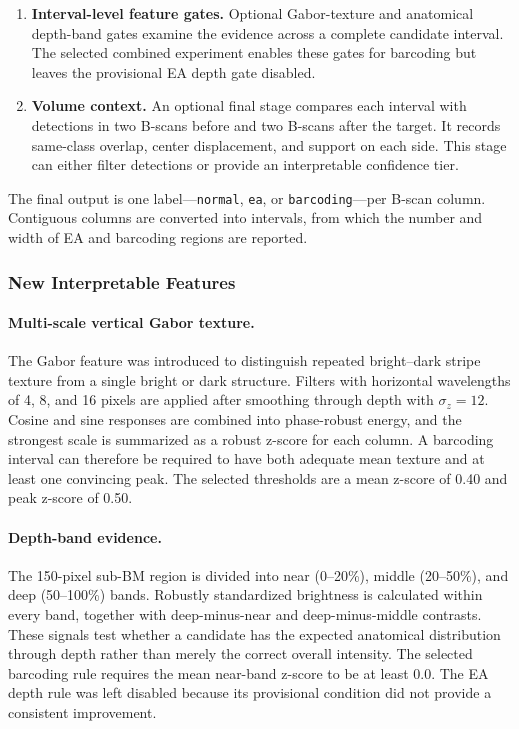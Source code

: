 \documentclass[11pt]{article}
\begin{document}
\begin{enumerate}
    \item \textbf{Interval-level feature gates.}  Optional Gabor-texture and
    anatomical depth-band gates examine the evidence across a complete
    candidate interval.  The selected combined experiment enables these gates
    for barcoding but leaves the provisional EA depth gate disabled.

    \item \textbf{Volume context.}  An optional final stage compares each
    interval with detections in two B-scans before and two B-scans after the
    target.  It records same-class overlap, center displacement, and support on
    each side.  This stage can either filter detections or provide an
    interpretable confidence tier.
\end{enumerate}

The final output is one label---\texttt{normal}, \texttt{ea}, or
\texttt{barcoding}---per B-scan column.  Contiguous columns are converted into
intervals, from which the number and width of EA and barcoding regions are
reported.

\subsubsection{New Interpretable Features}

\paragraph{Multi-scale vertical Gabor texture.}
The Gabor feature was introduced to distinguish repeated bright--dark stripe
texture from a single bright or dark structure.  Filters with horizontal
wavelengths of 4, 8, and 16 pixels are applied after smoothing through depth
with $\sigma_z=12$.  Cosine and sine responses are combined into phase-robust
energy, and the strongest scale is summarized as a robust z-score for each
column.  A barcoding interval can therefore be required to have both adequate
mean texture and at least one convincing peak.  The selected thresholds are a
mean z-score of 0.40 and peak z-score of 0.50.

\paragraph{Depth-band evidence.}
The 150-pixel sub-BM region is divided into near (0--20\%), middle (20--50\%),
and deep (50--100\%) bands.  Robustly standardized brightness is calculated
within every band, together with deep-minus-near and deep-minus-middle
contrasts.  These signals test whether a candidate has the expected anatomical
distribution through depth rather than merely the correct overall intensity.
The selected barcoding rule requires the mean near-band z-score to be at least
0.0.  The EA depth rule was left disabled because its provisional condition
did not provide a consistent improvement.
\end{document}
